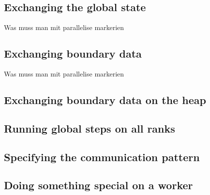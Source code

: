  

\subsection{Exchanging the global state}

Was muss man mit parallelise markerien

\subsection{Exchanging boundary data}

Was muss man mit parallelise markerien

\subsection{Exchanging boundary data on the heap}

\subsection{Running global steps on all ranks}

\subsection{Specifying the communication pattern}

\subsection{Doing something special on a worker}
